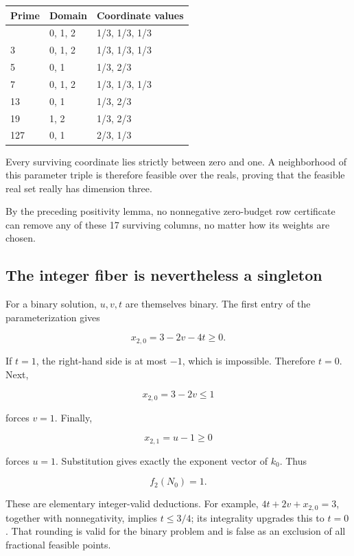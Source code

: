 \begin{longtable}[]{@{}lll@{}}
\toprule\noalign{}
Prime & Domain & Coordinate values \\
\midrule\noalign{}
\endhead
\bottomrule\noalign{}
\endlastfoot
2 & 0, 1, 2 & 1/3, 1/3, 1/3 \\
3 & 0, 1, 2 & 1/3, 1/3, 1/3 \\
5 & 0, 1 & 1/3, 2/3 \\
7 & 0, 1, 2 & 1/3, 1/3, 1/3 \\
13 & 0, 1 & 1/3, 2/3 \\
19 & 1, 2 & 1/3, 2/3 \\
127 & 0, 1 & 2/3, 1/3 \\
\end{longtable}

Every surviving coordinate lies strictly between zero and one. A neighborhood of this parameter triple is therefore feasible over the reals, proving that the feasible real set really has dimension three.

By the preceding positivity lemma, no nonnegative zero-budget row certificate can remove any of these 17 surviving columns, no matter how its weights are chosen.

\subsection{The integer fiber is nevertheless a singleton}\label{fractional:the-integer-fiber-is-nevertheless-a-singleton}

For a binary solution, \(u,v,t\) are themselves binary. The first entry of the parameterization gives

\[
x_{2,0}=3-2v-4t\ge0.
\]

If \(t=1\), the right-hand side is at most \(-1\), which is impossible. Therefore \(t=0\). Next,

\[
x_{2,0}=3-2v\le1
\]

forces \(v=1\). Finally,

\[
x_{2,1}=u-1\ge0
\]

forces \(u=1\). Substitution gives exactly the exponent vector of \(k_0\). Thus

\[
\boxed{f_2(N_0)=1.}
\]

These are elementary integer-valid deductions. For example, \(4t+2v+x_{2,0}=3\), together with nonnegativity, implies \(t\le3/4\); its integrality upgrades this to \(t=0\). That rounding is valid for the binary problem and is false as an exclusion of all fractional feasible points.

